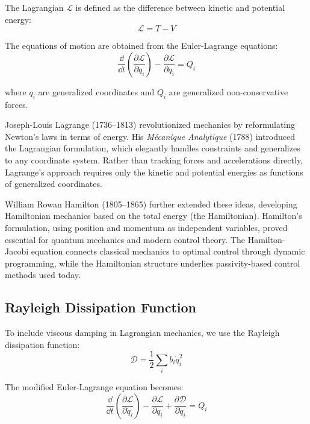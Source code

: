 The Lagrangian $\mathcal{L}$ is defined as the difference between kinetic and potential energy:
\begin{equation}
\mathcal{L} = T - V
\label{eq:lagrangian}
\end{equation}

The equations of motion are obtained from the Euler-Lagrange equations:
\begin{equation}
\frac{\dd}{\dd t}\left(\frac{\partial \mathcal{L}}{\partial \dot{q}_i}\right) - \frac{\partial \mathcal{L}}{\partial q_i} = Q_i
\label{eq:euler_lagrange}
\end{equation}

where $q_i$ are generalized coordinates and $Q_i$ are generalized non-conservative forces.

\begin{historicalbox}[title=Lagrange and Hamilton: Energy Methods in Mechanics]
Joseph-Louis Lagrange (1736--1813) revolutionized mechanics by reformulating Newton's laws in terms of energy. His \emph{M\'{e}canique Analytique} (1788) introduced the Lagrangian formulation, which elegantly handles constraints and generalizes to any coordinate system. Rather than tracking forces and accelerations directly, Lagrange's approach requires only the kinetic and potential energies as functions of generalized coordinates.

William Rowan Hamilton (1805--1865) further extended these ideas, developing Hamiltonian mechanics based on the total energy (the Hamiltonian). Hamilton's formulation, using position and momentum as independent variables, proved essential for quantum mechanics and modern control theory. The Hamilton-Jacobi equation connects classical mechanics to optimal control through dynamic programming, while the Hamiltonian structure underlies passivity-based control methods used today.
\end{historicalbox}

\subsection{Rayleigh Dissipation Function}

To include viscous damping in Lagrangian mechanics, we use the Rayleigh dissipation function:
\begin{equation}
\mathcal{D} = \frac{1}{2}\sum_i b_i \dot{q}_i^2
\label{eq:rayleigh}
\end{equation}

The modified Euler-Lagrange equation becomes:
\begin{equation}
\frac{\dd}{\dd t}\left(\frac{\partial \mathcal{L}}{\partial \dot{q}_i}\right) - \frac{\partial \mathcal{L}}{\partial q_i} + \frac{\partial \mathcal{D}}{\partial \dot{q}_i} = Q_i
\label{eq:euler_lagrange_damped}
\end{equation}

